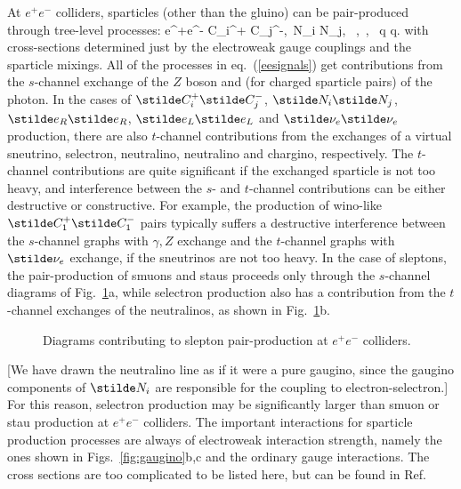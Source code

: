 At $e^+e^-$ colliders, sparticles (other than the
gluino) can be pair-produced through tree-level processes:
\beq
e^+e^- \rightarrow
\stilde C_i^+ \stilde C_j^-,\>\>\, \stilde N_i \stilde N_j,
\>\>\, \stilde \ell\stilde \ell,\>\>\, \stilde \nu \stilde \nu,
\>\>\, \stilde q \stilde q.
\label{eesignals}
\eeq
with cross-sections
determined just by the electroweak gauge couplings
and the sparticle mixings. All of the processes in eq.~(\ref{eesignals})
get contributions from the $s$-channel exchange of the $Z$ boson
and (for charged sparticle pairs) of the photon.
In the cases of $\stilde C_i^+ \stilde C_j^-$,
$\stilde N_i \stilde N_j$, $\stilde e_R \stilde e_R$,
$\stilde e_L \stilde e_L$ and  $\stilde \nu_e \stilde \nu_e$
production, there are also $t$-channel contributions from
the exchanges of a virtual sneutrino, selectron, neutralino,
neutralino and chargino, respectively. The $t$-channel
contributions are quite significant if the exchanged sparticle
is not too heavy, and interference between
the $s$- and $t$-channel contributions can be either destructive
or constructive. For example, the production of wino-like
$\stilde C_1^+ \stilde C_1^-$ pairs typically suffers a destructive
interference between the $s$-channel graphs with $\gamma,Z$ exchange
and the $t$-channel graphs with $\stilde \nu_e$ exchange, if the
sneutrinos are not too heavy.
In the case of sleptons, the pair-production of
smuons and staus
proceeds only through the $s$-channel diagrams of
Fig.~\ref{fig:sleptonprod}a, while selectron production
also has a contribution from the $t$-channel exchanges of the
neutralinos, as shown in Fig.~\ref{fig:sleptonprod}b.
\begin{figure}
\centerline{}
\caption{Diagrams contributing to slepton  pair-production at $e^+e^-$
colliders.
\label{fig:sleptonprod}}
\end{figure}
[We have drawn the neutralino line as if it were a pure gaugino,
since the gaugino components of $\stilde N_i$ are responsible
for the coupling to electron-selectron.]
For this reason, selectron production may be significantly larger
than smuon or stau production at $e^+e^-$ colliders.
The important interactions for sparticle production processes
are always of electroweak interaction strength, namely the ones
shown in
Figs.~\ref{fig:gaugino}b,c and the ordinary gauge interactions.
The cross sections are too complicated to be listed here,
but can be found in Ref.\cite{epluseminuscrosssections}

